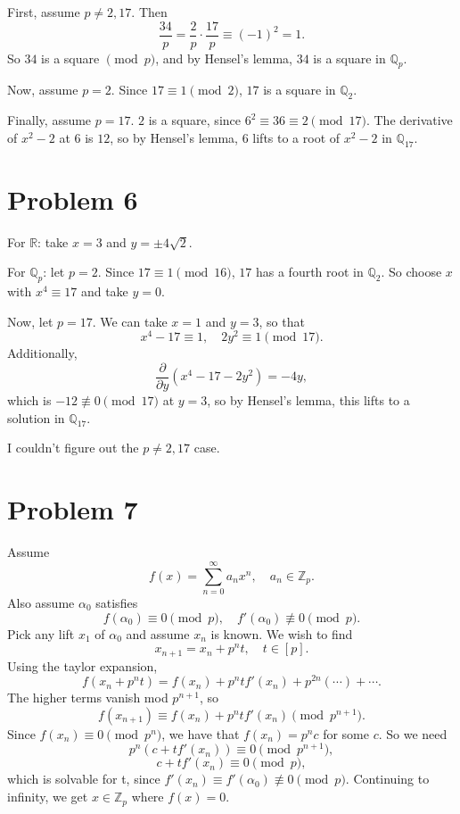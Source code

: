 \documentclass{article}
\newcommand{\Z}{\mathbb{Z}}
\newcommand{\Q}{\mathbb{Q}}
\newcommand{\R}{\mathbb{R}}
\begin{document}
First, assume $p \neq 2, 17$. Then
$$\frac{34}{p} = \frac{2}{p} \cdot \frac{17}{p} \equiv (-1)^2 = 1.$$
So $34$ is a square $\pmod{p}$, and by Hensel's lemma, $34$ is a square in $\Q_p$.

Now, assume $p = 2$. Since $17 \equiv 1 \pmod{2}$, $17$ is a square in $\Q_2$.

Finally, assume $p = 17$. $2$ is a square, since $6^2 \equiv 36 \equiv 2 \pmod{17}$. The derivative of $x^2 - 2$ at $6$ is $12$, so by Hensel's lemma, $6$ lifts to a root of $x^2 - 2$ in $\Q_{17}$.

\section*{Problem 6}
For $\R$: take $x = 3$ and $y = \pm 4\sqrt{2}$.

For $\Q_p$: let $p = 2$. Since $17 \equiv 1 \pmod{16}$, $17$ has a fourth root in $\Q_2$. So choose $x$ with $x^4 \equiv 17$ and take $y = 0$.

Now, let $p = 17$. We can take $x = 1$ and $y = 3$, so that
$$x^4 - 17 \equiv 1, \quad 2y^2 \equiv 1 \pmod{17}.$$
Additionally,
$$\frac{\partial}{\partial y}(x^4 - 17 - 2y^2) = -4y,$$
which is $-12 \not\equiv 0 \pmod{17}$ at $y = 3$, so by Hensel's lemma, this lifts to a solution in $\Q_{17}$.

I couldn't figure out the $p \neq 2, 17$ case.

\section*{Problem 7}
Assume
$$f(x) = \sum_{n = 0}^\infty a_nx^n, \quad a_n \in \Z_p.$$
Also assume $\alpha_0$ satisfies
$$f(\alpha_0) \equiv 0 \pmod{p}, \quad f'(\alpha_0) \not\equiv 0 \pmod{p}.$$
Pick any lift $x_1$ of $\alpha_0$ and assume $x_n$ is known. We wish to find
$$x_{n + 1} = x_n + p^nt, \quad t \in [p].$$
Using the taylor expansion,
$$f(x_n + p^nt) = f(x_n) + p^ntf'(x_n) + p^{2n}(\cdots) + \cdots.$$
The higher terms vanish mod $p^{n + 1}$, so
$$f(x_{n + 1}) \equiv f(x_n) + p^ntf'(x_n) \pmod{p^{n + 1}}.$$
Since $f(x_n) \equiv 0 \pmod{p^n}$, we have that $f(x_n) = p^nc$ for some $c$. So we need
$$p^n(c + tf'(x_n)) \equiv 0 \pmod{p^{n + 1}},$$
$$c + tf'(x_n) \equiv 0 \pmod{p},$$
which is solvable for t, since $f'(x_n) \equiv f'(\alpha_0) \not\equiv 0 \pmod{p}$. Continuing to infinity, we get $x \in \Z_p$ where $f(x) = 0$.
\end{document}
